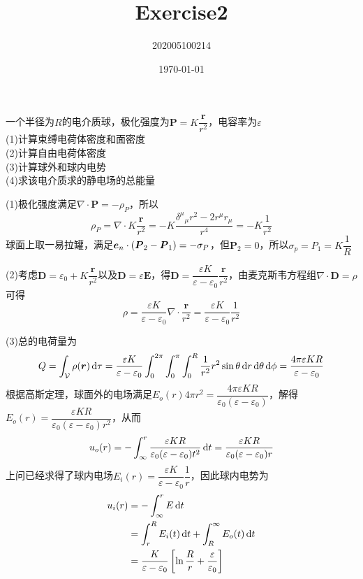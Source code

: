 \documentclass{mynote}
\title{Exercise2}
\author{202005100214}
\date\today
\begin{document}
\maketitle

\begin{exercise}{2.1}
    一个半径为$R$的电介质球，极化强度为$\bm{P} = K \dfrac{\bm{r}}{r^2}$，电容率为$\varepsilon$ \\
    (1)计算束缚电荷体密度和面密度 \\
    (2)计算自由电荷体密度\\
    (3)计算球外和球内电势\\
    (4)求该电介质求的静电场的总能量
\end{exercise}
\begin{solution}
(1)极化强度满足$\nabla \cdot \bm{P} = - \rho_P $，所以
\[
\rho_P = \nabla \cdot K \frac{\bm{r}}{r^2} = -K \frac{{\delta^{\mu}}_{\mu} r^2 - 2r^{\mu}r_{\mu}}{r^4} = -K \frac{1}{r^2}    
\]
球面上取一易拉罐，满足$\boldsymbol{e}_n \cdot (\boldsymbol{P}_2 - \boldsymbol{P}_1) = -\sigma_P$，但$\bm{P}_2 = 0$，所以$\sigma_p = P_1 = K \dfrac{1}{R}$

(2)考虑$\bm{D} = \varepsilon_0 + K \dfrac{\bm{r}}{r^2}$以及$\bm{D} = \varepsilon \bm{E}$，得$\bm{D} = \dfrac{\varepsilon K}{\varepsilon - \varepsilon_0} \dfrac{\bm{r}}{r^2}$，由麦克斯韦方程组$\nabla \cdot \bm{D} = \rho$可得
\[
\rho = \dfrac{\varepsilon K}{\varepsilon - \varepsilon_0}  \nabla \cdot \dfrac{\bm{r}}{r^2} = \dfrac{\varepsilon K}{\varepsilon - \varepsilon_0} \frac{1}{r^2}
\]

(3)总的电荷量为
\[
Q = \int_{\mathcal{V}} \rho(\boldsymbol{r}) \mathop{}\!\mathrm{d} \tau = \dfrac{\varepsilon K}{\varepsilon - \varepsilon_0} \int_{0}^{2 \pi} \int_{0}^{\pi} \int_{0}^{R} \frac{1}{r^2} r^2 \sin \theta  \mathop{}\!\mathrm{d} r \mathop{}\!\mathrm{d} \theta \mathop{}\!\mathrm{d} \phi = \frac{4\pi \varepsilon K R}{\varepsilon - \varepsilon_0}
\]
根据高斯定理，球面外的电场满足$E_o(r) 4 \pi r^2 = \dfrac{4\pi \varepsilon K R}{\varepsilon_0 (\varepsilon - \varepsilon_0)}$，解得$E_o(r) = \dfrac{\varepsilon K R}{\varepsilon_0(\varepsilon - \varepsilon_0) r^2}$，从而
\[
u_o(r) = -\int_{\infty}^r \dfrac{\varepsilon K R}{\varepsilon_0(\varepsilon - \varepsilon_0) t^2} \mathop{}\!\mathrm{d} t = \dfrac{\varepsilon K R}{\varepsilon_0(\varepsilon - \varepsilon_0) r}
\]
上问已经求得了球内电场$E_i(r) = \dfrac{\varepsilon K}{\varepsilon - \varepsilon_0} \dfrac{1}{r}$，因此球内电势为
\begin{align*}
    u_i(r) &= -\int_{\infty}^{r} E \mathop{}\!\mathrm{d} t\\
&= \int_{r}^{R} E_i(t) \mathop{}\!\mathrm{d} t + \int_{R}^{\infty} E_o(t) \mathop{}\!\mathrm{d} t \\
&= \frac{K}{\varepsilon - \varepsilon_0} \left[ \ln \frac{R}{r} + \frac{\varepsilon}{\varepsilon_0} \right]
\end{align*}


\end{solution}
\end{document}
